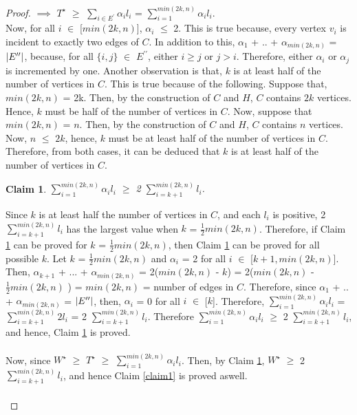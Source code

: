 \documentclass[12pt]{article}
\newtheorem{claim}{Claim}
\numberwithin{equation}{subsection}
\numberwithin{table}{subsection}
\numberwithin{algorithm}{subsection}
\numberwithin{figure}{subsection}
\begin{document}
\begin{proof}
$\implies$ $T^\star$ $\geq$ $\sum_{i \in E^\prime} \alpha_i l_i$ = $\sum_{i =1}^{min(2k, n)} \alpha_i l_i$.\\ Now, for all $i$ $\in$ [$min(2k, n)$], $\alpha_i$ $\leq$ 2. This is true because, every vertex $v_i$ is incident to exactly two edges of $C$. In addition to this, $\alpha_1$ + .. + $\alpha_{min(2k, n)}$ = $\abs{E^{\prime\prime}}$, because, for all $\{i,j\}$ $\in$ $E^{\prime\prime}$, either $ i \geq j$ or $j > i$. Therefore, either $\alpha_i$ or $\alpha_j$ is incremented by one. Another observation is that, $k$ is at least half of the number of vertices in $C$. This is true because of the following. Suppose that, $min(2k, n)$ = 2k. Then, by the construction of $C$ and $H$, $C$ contains $2k$ vertices. Hence, $k$ must be half of the number of vertices in $C$. Now, suppose that $min(2k, n)$ = $n$. Then, by the construction of $C$ and $H$, $C$ contains $n$ vertices. Now, $n$ $\leq$ $2k$, hence, $k$ must be at least half of the number of vertices in $C$. Therefore, from both cases, it can be deduced that $k$ is at least half of the number of vertices in $C$.
\begin{claim}
\label{claim2}
$\sum_{i =1}^{min(2k, n)} \alpha_i l_i$ $\geq$ 2 $\sum_{i = k + 1}^{min(2k, n)} l_i$.
\end{claim}
Since $k$ is at least half the number of vertices in $C$, and each $l_i$ is positive, 2 $\sum_{i = k + 1}^{min(2k, n)} l_i$ has the largest value when $k$ = $\frac{1}{2} min(2k, n)$. Therefore, if Claim \ref{claim2} can be proved for $k$ = $\frac{1}{2} min(2k, n)$, then Claim \ref{claim2} can be proved for all possible $k$. Let $k$ = $\frac{1}{2} min(2k, n)$ and $\alpha_i$ = 2 for all $i$ $\in$ [$k+1,min(2k, n)$]. Then, $\alpha_{k+1}$ + ... + $\alpha_{min(2k, n)}$ = 2($min(2k, n)$ - $k$) = 2($min(2k, n)$ -  $\frac{1}{2} min(2k, n)$ ) =  $min(2k, n)$ = number of edges in $C$. Therefore, since $\alpha_1$ + .. + $\alpha_{min(2k, n)}$ = $\abs{E^{\prime\prime}}$, then, $\alpha_i$ = 0 for all $i$ $\in$ [$k$]. Therefore, $\sum_{i =1}^{min(2k, n)} \alpha_i l_i$ = $\sum_{i = k + 1}^{min(2k, n)}2 l_i$ = 2 $\sum_{i = k + 1}^{min(2k, n)} l_i$. Therefore $\sum_{i =1}^{min(2k, n)} \alpha_i l_i$ $\geq$ 2 $\sum_{i = k + 1}^{min(2k, n)} l_i$, and hence, Claim \ref{claim2} is proved.\\\\
Now, since $W^\star$ $\geq$ $T^\star$ $\geq$ $\sum_{i =1}^{min(2k, n)} \alpha_i l_i$. Then, by Claim \ref{claim2}, $W^\star$  $\geq$ 2 $\sum_{i = k + 1}^{min(2k, n)} l_i$, and hence Claim \ref{claim1} is proved aswell.\\\\

\end{proof}
\end{document}
